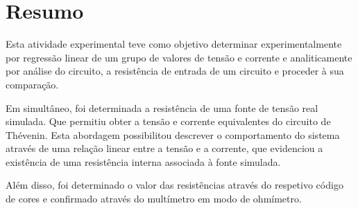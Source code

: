 \section{Resumo}

Esta atividade experimental teve como objetivo determinar experimentalmente por regressão linear de um grupo de valores de tensão e corrente e analiticamente por análise do circuito, a
resistência de entrada de um circuito e proceder à sua comparação.

Em simultâneo, foi determinada a resistência de uma
fonte de tensão real simulada. Que permitiu obter a tensão e corrente equivalentes do circuito de Thévenin. Esta abordagem possibilitou descrever o comportamento do sistema através de uma relação linear entre a tensão e a corrente, que evidenciou a existência de uma resistência interna associada à fonte simulada.

Além disso, foi determinado o valor das
resistências através do respetivo código de cores e confirmado através do multímetro em modo de ohmímetro.


